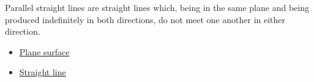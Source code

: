 \begin{definition}
\label{def:euclid-parallel-straight-lines}
Parallel straight lines are straight lines which, being in the same plane and
being produced indefinitely in both directions, do not meet one another in
either direction.
\end{definition}
\begin{lra-not-visible}
\begin{dependencies}
\begin{itemize}
  \item \hyperref[def:euclid-plane-surface]{Plane surface}
  \item \hyperref[def:euclid-straight-line]{Straight line}
\end{itemize}
\end{dependencies}
\end{lra-not-visible}
